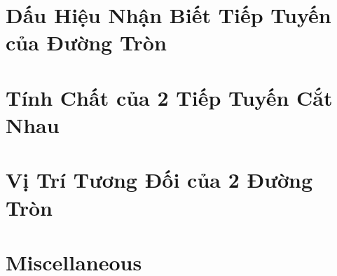 \documentclass{article}
\begin{document}

\section{Dấu Hiệu Nhận Biết Tiếp Tuyến của Đường Tròn}


\section{Tính Chất của 2 Tiếp Tuyến Cắt Nhau}


\section{Vị Trí Tương Đối của 2 Đường Tròn}


\section{Miscellaneous}


\printbibliography[heading=bibintoc]
	
\end{document}
